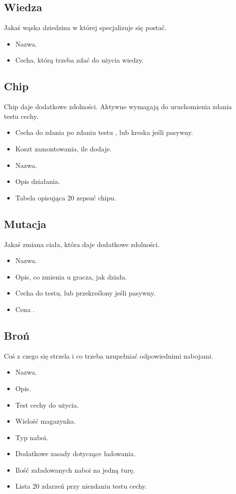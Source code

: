 \subsection{Wiedza}
Jakaś wąska dziedzina w której specjalizuje się postać.
\begin{itemize}
 \item Nazwa.
 \item Cecha, którą trzeba zdać do użycia wiedzy.
\end{itemize}

\subsection{Chip}
Chip daje dodatkowe zdolności.
Aktywne wymagają do uruchomienia zdania testu cechy.
\begin{itemize}
 \item Cecha do zdania po zdaniu testu \abnkp{}, lub kreska jeśli pasywny.
 \item Koszt zamontowania, ile \abnkp{} dodaje.
 \item Nazwa.
 \item Opis działania.
 \item Tabela opisująca 20 zepsuć chipu.
\end{itemize}

\subsection{Mutacja}
Jakaś zmiana ciała, która daje dodatkowe zdolności.
\begin{itemize}
 \item Nazwa.
 \item Opis, co zmienia u gracza, jak działa.
 \item Cecha do testu, lub przekreślony jeśli pasywny.
 \item Cena \abnkp{}. 
\end{itemize}

\subsection{Broń}
Coś z czego się strzela i co trzeba uzupełniać odpowiednimi nabojami.
\begin{itemize}
 \item Nazwa.
 \item Opis.
 \item Test cechy do użycia.
 \item Wielość magazynka.
 \item Typ naboi.
 \item Dodatkowe zasady dotyczące ładowania.
 \item Ilość załadowanych naboi na jedną turę.
 \item Lista 20 zdarzeń przy niezdaniu testu cechy.
\end{itemize}











